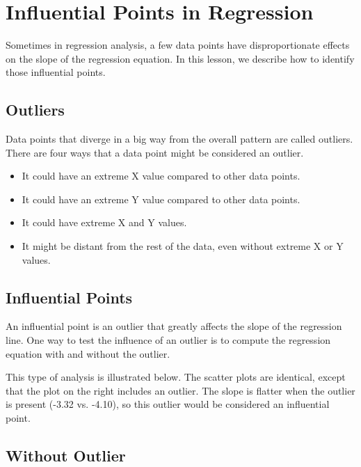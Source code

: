 \documentclass[residuals.tex]{subfiles}
\begin{document}
	
\section{Influential Points in Regression}
 

Sometimes in regression analysis, a few data points have disproportionate effects on the slope of the regression equation. In this lesson, we describe how to identify those influential points.

\subsection{Outliers}

Data points that diverge in a big way from the overall pattern are called outliers. There are four ways that a data point might be considered an outlier.

\begin{itemize}
\item It could have an extreme X value compared to other data points.
\item It could have an extreme Y value compared to other data points.
\item It could have extreme X and Y values.
\item It might be distant from the rest of the data, even without extreme X or Y values.
\end{itemize}


\subsection{Influential Points}

An influential point is an outlier that greatly affects the slope of the regression line. One way to test the influence of an outlier is to compute the regression equation with and without the outlier.

This type of analysis is illustrated below. The scatter plots are identical, except that the plot on the right includes an outlier. The slope is flatter when the outlier is present (-3.32 vs. -4.10), so this outlier would be considered an influential point.

\subsection{Without Outlier}
\end{document}
